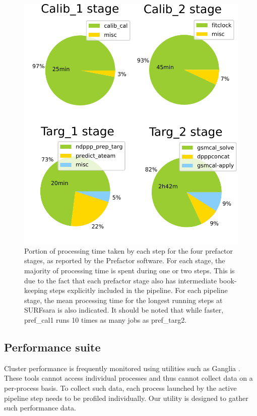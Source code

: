 \begin{figure} 
    \includegraphics[width=0.95\linewidth]{ch4/figures/fig2/4pies.pdf}
      \caption{Portion of processing time taken by each step for the four prefactor stages, as reported by the Prefactor software. For each stage, the majority of processing time is spent during one or two steps. This is due to the fact that each prefactor stage also has intermediate book-keeping steps explicitly included in the pipeline. For each pipeline stage, the mean processing time for the longest running steps at SURFsara is also indicated. It should be noted that while faster, pref\_cal1 runs 10 times as many jobs as pref\_targ2. }
	\label{fig:ch4_4_steps_pies}
\end{figure}


\subsection{Performance suite}
Cluster performance is frequently monitored using utilities such as Ganglia \citep[][discussed in Section \ref{sec:ch4_related}]{ganglia}. These tools cannot access individual processes and thus cannot collect data on a per-process basis. To collect such data, each process launched by the active pipeline step needs to be profiled individually. Our utility is designed to gather such performance data.


